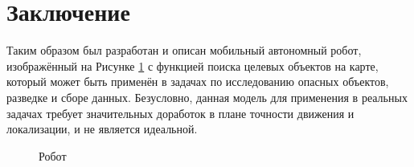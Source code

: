\documentclass[12pt,a4paper]{scrartcl}
\begin{document}
			\section*{Заключение}
				Таким образом был разработан и описан мобильный автономный робот, изображённый на Рисунке \ref{fig:Robot} с функцией поиска целевых объектов на карте, который может быть применён в задачах по исследованию опасных объектов, разведке и сборе данных. Безусловно, данная модель для применения в реальных задачах требует значительных доработок в плане точности движения и локализации, и не является идеальной.
				
				\begin{figure}[h]
					\caption{Робот}
					\label{fig:Robot}
				\end{figure}
				
\end{document}
